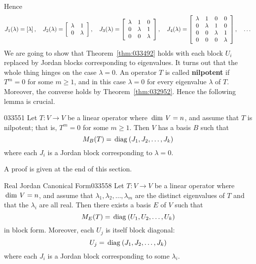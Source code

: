\noindent Hence
\begin{equation*}
J_1(\lambda) = \left[ \lambda \right], \quad J_2(\lambda) = \left[ \begin{array}{cc}
\lambda & 1 \\
0 & \lambda
\end{array} \right], \quad J_3(\lambda) = \left[ \begin{array}{ccc}
\lambda & 1 & 0 \\
0 & \lambda & 1 \\
0 & 0 & \lambda
\end{array} \right], \quad J_4(\lambda) = \left[ \begin{array}{cccc}
\lambda & 1 & 0 & 0 \\
0 & \lambda & 1 & 0 \\
0 & 0 & \lambda & 1 \\
0 & 0 & 0 & \lambda
\end{array} \right], \quad \dots
\end{equation*}
We are going to show that Theorem~\ref{thm:033492} holds with each block $U_{i}$ replaced by Jordan blocks corresponding to eigenvalues. It turns out that the whole thing hinges on the case $\lambda = 0$. An operator $T$ is called \textbf{nilpotent} if $T^{m} = 0$ for some $m \geq 1$, and in this case $\lambda = 0$ for every eigenvalue $\lambda$ of $T$. Moreover, the converse holds by Theorem~\ref{thm:032952}. Hence the following lemma is crucial.


\begin{lemma}{}{033551}
Let $T : V \to V$ be a linear operator where $\thinspace\operatorname{dim \medspace}V = n$, and assume that $T$ is nilpotent; that is, $T^{m} = 0$ for some $m \geq 1$. Then $V$ has a basis $B$ such that
\begin{equation*}
M_B(T) = \thinspace\operatorname{diag\medspace}(J_1, J_2, \dots, J_k)
\end{equation*}
where each $J_{i}$ is a Jordan block corresponding to $\lambda = 0$.\footnotemark
\end{lemma}

\noindent A proof is given at the end of this section.


\begin{theorem}{Real Jordan Canonical Form}{033558}
Let $T : V \to V$ be a linear operator where $\thinspace\operatorname{dim \medspace}V = n$, and assume that $\lambda_{1}, \lambda_{2}, \dots, \lambda_{m}$ are the distinct eigenvalues of $T$ and that the $\lambda_{i}$ are all real. Then there exists a basis $E$ of $V$ such that
\begin{equation*}
M_E(T) = \thinspace\operatorname{diag\medspace}(U_1, U_2, \dots, U_k)
\end{equation*}
in block form. Moreover, each $U_{j}$ is itself block diagonal:
\begin{equation*}
U_j = \thinspace\operatorname{diag\medspace}(J_1, J_2, \dots, J_k)
\end{equation*}
where each $J_{i}$ is a Jordan block corresponding to some $\lambda_{i}$.
\end{theorem}

